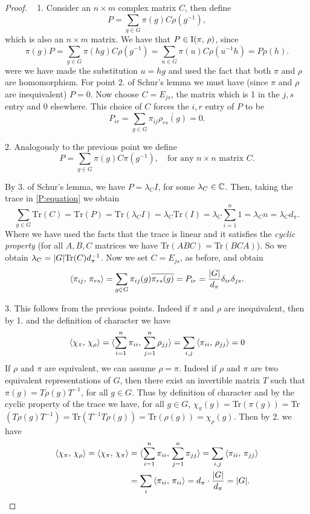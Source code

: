 \begin{proof}~ 
1. Consider an $n\times m$ complex matrix $C$, then define
\begin{equation*}
P=\sum_{g\in G}\pi(g)C\rho(g^{-1}),
\end{equation*}
which is also an $n\times m$ matrix. We have that $P\in \operatorname{I}(\pi, \, \rho)$, since
\[
\pi(g)P=\sum_{g \in G}\pi(hg)C\rho(g^{-1})=\sum_{u\in G}\pi(u)C\rho(u^{-1}h)=P\rho(h).
\]
were we have made the substitution $u=hg$ and  used the fact that both $\pi$ and $\rho$ are homomorphism. For point 2. of Schur's lemma we must have (since $\pi$ and $\rho$ are inequivalent) $P=0$. Now choose $C=E_{js}$, the matrix which is 1 in the $j,s$ entry and 0 elsewhere. This choice of $C$ forces the $i,r$ entry of $P$ to be 
\[
P_{ir}=\sum_{g\in G}\pi_{ij}\overline{\rho_{rs}(g)}=0.
\]

2. Analogously to the previous point we define 
\begin{equation}
\label{P:equation}
P=\sum_{g\in G}\pi(g)C\pi(g^{-1}), \quad \text{for any $n\times n$ matrix $C$.}
\end{equation}

By 3. of Schur's lemma, we have $P=\lambda_CI$, for some $\lambda_C\in {\mathbb C}$. Then, taking the trace in \ref{P:equation} we obtain
\[
\text{$\sum_{g\in G}$Tr$(C)=$Tr$(P)=$Tr$(\lambda_CI)=\lambda_C$Tr$(I)=\lambda_C\sum_{i=1}^n 1=\lambda_Cn=\lambda_Cd_\pi.$}
\]  
Where we have used the facts that the trace is linear and it satisfies the \emph{cyclic property} (for all $A,B,C$ matrices we have Tr$(ABC)=$Tr$(BCA)$). So we obtain $\lambda_C=\lvert G\rvert \text{Tr$(C)d_\pi^{-1}$}$. Now we set $C=E_{js}$, as before, and obtain 
\[
\braket{\pi_{ij},\, \pi_{rs}}=\sum_{g\in G}\pi_{ij}(g)\overline{\pi_{rs}(g)}=P_{ir}=\frac{\lvert G\rvert}{d_\pi}\delta_{ir}\delta_{js}.
\]

3. This follows from the previous points. Indeed if $\pi$ and $\rho$ are inequivalent, then by 1. and the definition of character we have
\[
\braket{\chi_\pi,\, \chi_\rho}=\braket{\sum_{i=1}^n\pi_{ii},\, \sum_{j=1}^n\rho_{jj} }=\sum_{i,j}\braket{\pi_{ii},\, \rho_{jj} }=0
\]
If $\rho$ and $\pi$ are equivalent, we can assume $\rho=\pi$. Indeed if $\rho$ and $\pi$ are two equivalent representations of $G$, then there exist  an invertible matrix $T$ such that $\pi(g)=T\rho(g)T^{-1}$, for all $g\in G$. Thus by definition of character and by the cyclic property of the trace we have, for all $g\in G$, $\chi_\pi(g)=$Tr$(\pi(g))=$Tr$(T\rho(g)T^{-1})=$Tr$(T^{-1}T\rho(g))= $Tr$(\rho(g))=\chi_\rho(g)$. Then by 2. we have
\[
\begin{split}
\braket{\chi_\pi,\, \chi_\rho}=\braket{\chi_\pi,\, \chi_\pi}&=\braket{\sum_{i=1}^n\pi_{ii},\, \sum_{j=1}^n\pi_{jj} }=\sum_{i,j}\braket{\pi_{ii},\, \pi_{jj} }\\
&=\sum_{i}\braket{\pi_{ii},\, \pi_{ii} }=d_\pi\cdot\frac{\lvert G\rvert}{d_\pi}=\lvert G\rvert.
\end{split}
\]
\end{proof}

